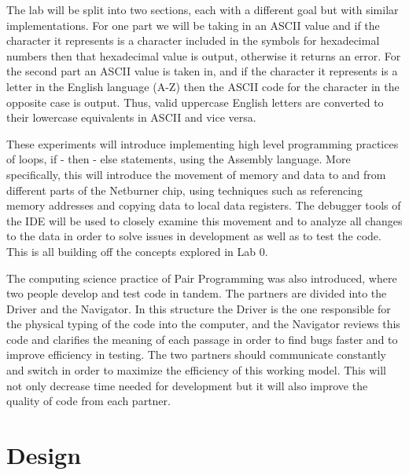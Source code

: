 \documentclass[letterpaper]{article}
\begin{document}
  The lab will be split into two sections, each with a different goal but with similar implementations.
  For one part we will be taking in an ASCII value and if the character it represents is a character
  included in the symbols for hexadecimal numbers then that hexadecimal value is output, otherwise
  it returns an error.  For the second part an ASCII value is taken in, and if the character it represents
  is a letter in the English language (A-Z) then the ASCII code for the character in the opposite case
  is output.  Thus, valid uppercase English letters are converted to their lowercase equivalents in ASCII
  and vice versa.

  These experiments will introduce implementing high level programming practices of loops, if - then - else statements,
  using the Assembly language. More specifically, this will introduce the movement of
  memory and data to and from different parts of the Netburner chip, using techniques such as referencing
  memory addresses and copying data to local data registers.  The debugger tools of the IDE will be used
  to closely examine this movement and to analyze all changes to the data in order to solve issues in
  development as well as to test the code.  This is all building off the concepts explored in Lab 0.

  The computing science practice of Pair Programming was also introduced, where two people
  develop and test code in tandem.  The partners are divided into the Driver and the Navigator.
  In this structure the Driver is the one responsible for the physical typing of the code into the computer,
  and the Navigator reviews this code and clarifies the meaning of each passage in order to find bugs faster
  and to improve efficiency in testing.  The two partners should communicate constantly and switch in order
  to maximize the efficiency of this working model.  This will not only decrease time needed for development
  but it will also improve the quality of code from each partner.


\section{Design}
\end{document}
